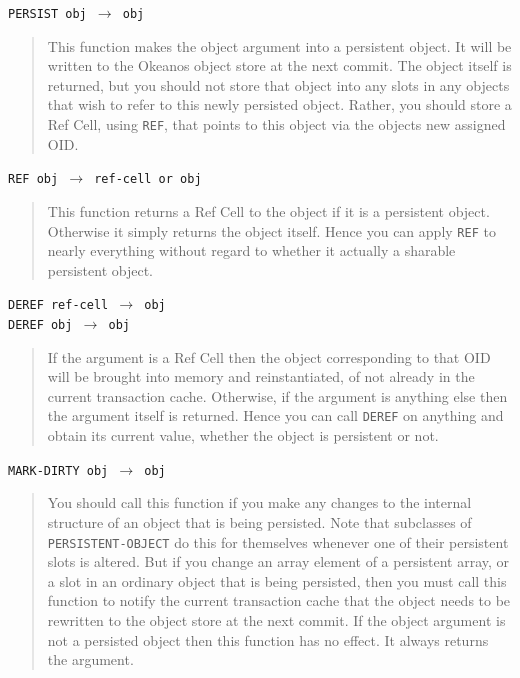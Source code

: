 \documentclass[article,oneside]{memoir}
\begin{document}
\noindent \texttt{PERSIST obj $\rightarrow$ obj}

\begin{quote}
This function makes the object argument into a persistent object. It will be written to the Okeanos object store at the next commit. The object itself is returned, but you should not store that object into any slots in any objects that wish to refer to this newly persisted object. Rather, you should store a Ref Cell, using \texttt{REF}, that points to this object via the objects new assigned OID.
\end{quote}

\noindent \texttt{REF obj $\rightarrow$ ref-cell or obj}

\begin{quote}
This function returns a Ref Cell to the object if it is a persistent object. Otherwise it simply returns the object itself. Hence you can apply \texttt{REF} to nearly everything without regard to whether it actually a sharable persistent object.
\end{quote}

\noindent \texttt{DEREF ref-cell $\rightarrow$ obj} \\
\noindent \texttt{DEREF obj $\rightarrow$ obj}

\begin{quote}
If the argument is a Ref Cell then the object corresponding to that OID will be brought into memory and reinstantiated, of not already in the current transaction cache. Otherwise, if the argument is anything else then the argument itself is returned. Hence you can call \texttt{DEREF} on anything and obtain its current value, whether the object is persistent or not.
\end{quote}


\noindent \texttt{MARK-DIRTY obj $\rightarrow$ obj}

\begin{quote}
You should call this function if you make any changes to the internal structure of an object that is being persisted. Note that subclasses of \texttt{PERSISTENT-OBJECT} do this for themselves whenever one of their persistent slots is altered. But if you change an array element of a persistent array, or a slot in an ordinary object that is being persisted, then you must call this function to notify the current transaction cache that the object needs to be rewritten to the object store at the next commit. If the object argument is not a persisted object then this function has no effect. It always returns the argument.
\end{quote}
\end{document}
